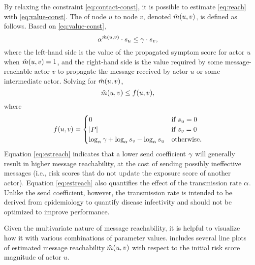 By relaxing the constraint \eqref{eq:contact-const}, it is possible to estimate \eqref{eq:reach} with \eqref{eq:value-const}. The  of node $u$ to node $v$, denoted $\hat{m}(u, v)$, is defined as follows. Based on \eqref{eq:value-const},
%
\begin{equation*}
  \alpha^{\hat{m}(u, v)} \cdot s_u \leq \gamma \cdot s_v,
\end{equation*}
%
where the left-hand side is the value of the propagated symptom score for actor $u$ when $\hat{m}(u, v) = 1$, and the right-hand side is the value required by some message-reachable actor $v$ to propagate the message received by actor $u$ or some intermediate actor. Solving for $\hat{m}(u, v)$,
%
\begin{equation}\label{eq:estreach}
  \hat{m}(u, v) \leq f(u, v),
\end{equation}
%
where
%
\begin{equation*}
  f(u, v) = 
  \begin{cases} 
    0 & \text{if $s_u = 0$} \\
    \left\vert P \right\vert & \text{if $s_v = 0$} \\
    \log_{\alpha}\gamma + \log_{\alpha}s_v - \log_{\alpha}s_u & \text{otherwise.}
  \end{cases}
\end{equation*}
%
Equation \eqref{eq:estreach} indicates that a lower send coefficient $\gamma$ will generally result in higher message reachability, at the cost of sending possibly ineffective messages (i.e., risk scores that do not update the exposure score of another actor). Equation \eqref{eq:estreach} also quantifies the effect of the transmission rate $\alpha$. Unlike the send coefficient, however, the transmission rate is intended to be derived from epidemiology to quantify disease infectivity and should not be optimized to improve performance.

Given the multivariate nature of message reachability, it is helpful to visualize how it with various combinations of parameter values.  includes several line plots of estimated message reachability $\hat{m}(u, v)$ with respect to the initial risk score magnitude of actor $u$.

